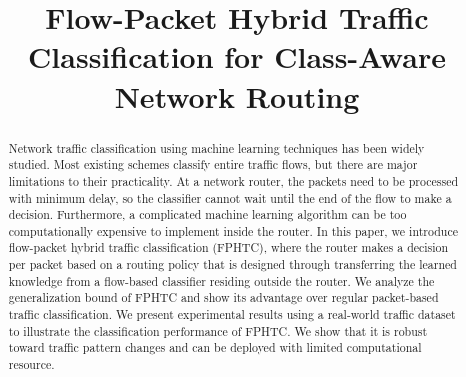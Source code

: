 \documentclass[conference, onecolumn]{IEEEtran}
\begin{document}
\title{Flow-Packet Hybrid Traffic Classification for Class-Aware Network Routing}

\author{
}


\maketitle

\begin{abstract}
	Network traffic classification using machine learning techniques has been widely studied. Most existing schemes classify entire traffic flows, but there are major limitations to their practicality. At a network router, the packets need to be processed with minimum delay, so the classifier cannot wait until the end of the flow to make a decision. Furthermore, a complicated machine learning algorithm can be too computationally expensive to implement inside the router. In this paper, we introduce flow-packet hybrid traffic classification (FPHTC), where the router makes a decision per packet based on a routing policy that is designed through transferring the learned knowledge from a flow-based classifier residing outside the router. We analyze the generalization bound of FPHTC and show its advantage over regular packet-based traffic classification. We present experimental results using a real-world traffic dataset to illustrate the classification performance of FPHTC. We show that it is robust toward traffic pattern changes and can be deployed with limited computational resource.
\end{abstract}











\end{document}

